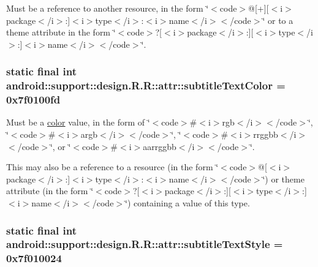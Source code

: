 Must be a reference to another resource, in the form \char`\"{}$<$code$>$@\mbox{[}+\mbox{]}\mbox{[}$<$i$>$package$<$/i$>$:\mbox{]}$<$i$>$type$<$/i$>$:$<$i$>$name$<$/i$>$$<$/code$>$\char`\"{} or to a theme attribute in the form \char`\"{}$<$code$>$?\mbox{[}$<$i$>$package$<$/i$>$:\mbox{]}\mbox{[}$<$i$>$type$<$/i$>$:\mbox{]}$<$i$>$name$<$/i$>$$<$/code$>$\char`\"{}. \hypertarget{classandroid_1_1support_1_1design_1_1_r_1_1attr_9af8383601548a70e261bc42a3a35cda}{
\subsubsection[{subtitleTextColor}]{\setlength{\rightskip}{0pt plus 5cm}static final int android::support::design.R.R::attr::subtitleTextColor = 0x7f0100fd}}
\label{classandroid_1_1support_1_1design_1_1_r_1_1attr_9af8383601548a70e261bc42a3a35cda}


Must be a \hyperlink{classandroid_1_1support_1_1design_1_1_r_1_1color}{color} value, in the form of \char`\"{}$<$code$>$\#$<$i$>$rgb$<$/i$>$$<$/code$>$\char`\"{}, \char`\"{}$<$code$>$\#$<$i$>$argb$<$/i$>$$<$/code$>$\char`\"{}, \char`\"{}$<$code$>$\#$<$i$>$rrggbb$<$/i$>$$<$/code$>$\char`\"{}, or \char`\"{}$<$code$>$\#$<$i$>$aarrggbb$<$/i$>$$<$/code$>$\char`\"{}. 

This may also be a reference to a resource (in the form \char`\"{}$<$code$>$@\mbox{[}$<$i$>$package$<$/i$>$:\mbox{]}$<$i$>$type$<$/i$>$:$<$i$>$name$<$/i$>$$<$/code$>$\char`\"{}) or theme attribute (in the form \char`\"{}$<$code$>$?\mbox{[}$<$i$>$package$<$/i$>$:\mbox{]}\mbox{[}$<$i$>$type$<$/i$>$:\mbox{]}$<$i$>$name$<$/i$>$$<$/code$>$\char`\"{}) containing a value of this type. \hypertarget{classandroid_1_1support_1_1design_1_1_r_1_1attr_20ee7f7275a55c2913c0d3908841ebcc}{
\subsubsection[{subtitleTextStyle}]{\setlength{\rightskip}{0pt plus 5cm}static final int android::support::design.R.R::attr::subtitleTextStyle = 0x7f010024}}
\label{classandroid_1_1support_1_1design_1_1_r_1_1attr_20ee7f7275a55c2913c0d3908841ebcc}


